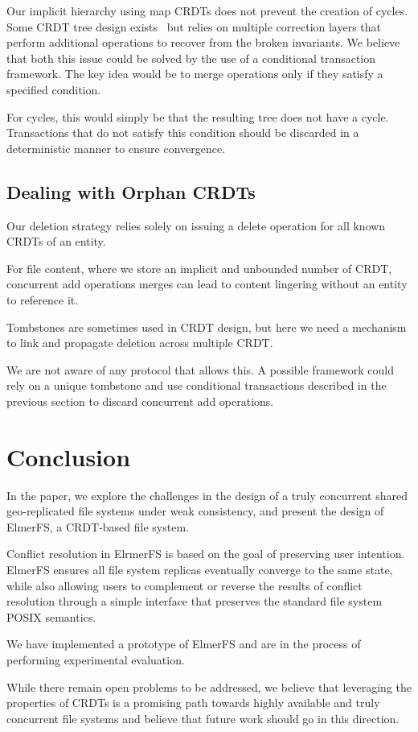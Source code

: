 \documentclass[sigconf,anonymous,10pt]{acmart}
\begin{document}
Our implicit hierarchy using map CRDTs does not prevent the creation of cycles.
Some CRDT tree design exists~\cite{martin2012abstract} but relies on multiple correction
layers that perform additional operations to recover from the broken invariants.
We believe that both this issue could be solved by the use of a conditional transaction framework.
The key idea would be to merge operations only if they satisfy a specified condition.

For cycles, this would simply be that the resulting tree does not have a cycle.
Transactions that do not satisfy this condition should be discarded
in a deterministic manner to ensure convergence.

\subsection{Dealing with Orphan CRDTs}

Our deletion strategy relies solely on issuing a delete operation for all
known CRDTs of an entity.

For file content, where we store an implicit and unbounded number of CRDT,
concurrent add operations merges can lead to content lingering
without an entity to reference it.

Tombstones are sometimes used in CRDT design, but here we need a mechanism
to link and propagate deletion across multiple CRDT.

We are not aware of any protocol that allows this.
A possible framework could rely on a unique tombstone and use conditional
transactions described in the previous section to discard concurrent
add operations.

\section{Conclusion}

In the paper, we explore the challenges in the design of a truly
concurrent shared geo-replicated file systems under weak consistency,
and present the design of ElmerFS, a CRDT-based file system.

Conflict resolution in ElrmerFS is based on the goal of preserving user
intention.
ElmerFS ensures all file system replicas eventually converge to the same state,
while also allowing users to complement or reverse the results of conflict resolution
through a simple interface that preserves the standard file system POSIX semantics.

We have implemented a prototype of ElmerFS and are in the process of performing
experimental evaluation.

While there remain open problems to be addressed,
we believe that leveraging the properties of CRDTs is a promising path towards
highly available and truly concurrent file systems and believe that future
work should go in this direction.



\end{document}
